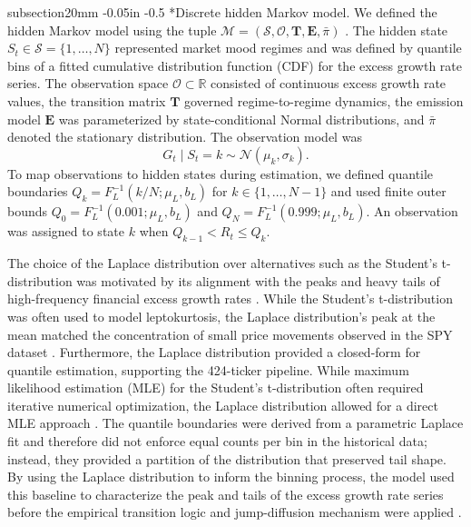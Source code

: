 \documentclass[12pt, letterpaper]{article}
\makeatletter
\renewcommand\subsection{\@startsection
	{subsection}{2}{0mm}
	{-0.05in}
	{-0.5\baselineskip}
	{\normalfont\normalsize\bfseries}}
\makeatother
\begin{document}
\subsection*{Discrete hidden Markov model.}
We defined the hidden Markov model using the tuple $\mathcal{M} = (\mathcal{S}, \mathcal{O}, \mathbf{T}, \mathbf{E}, \bar{\pi})$ \cite{rabiner_introduction_1986}. The hidden state $S_t \in \mathcal{S} = \{1,\dots,N\}$ represented market mood regimes and was defined by quantile bins of a fitted cumulative distribution function (CDF) for the excess growth rate series. The observation space $\mathcal{O} \subset \mathbb{R}$ consisted of continuous excess growth rate values, the transition matrix $\mathbf{T}$ governed regime-to-regime dynamics, the emission model $\mathbf{E}$ was parameterized by state-conditional Normal distributions, and $\bar{\pi}$ denoted the stationary distribution. The observation model was
\begin{equation}
    G_t \mid S_t = k \sim \mathcal{N}(\mu_k, \sigma_k).
\end{equation}
To map observations to hidden states during estimation, we defined quantile boundaries $Q_k = F_L^{-1}(k/N; \mu_L, b_L)$ for $k \in \{1,\dots,N-1\}$ and used finite outer bounds $Q_0 = F_L^{-1}(0.001; \mu_L, b_L)$ and $Q_N = F_L^{-1}(0.999; \mu_L, b_L)$. An observation was assigned to state $k$ when $Q_{k-1} < R_t \le Q_k$.

The choice of the Laplace distribution over alternatives such as the Student's t-distribution was motivated by its alignment with the peaks and heavy tails of high-frequency financial excess growth rates \cite{cont_empirical_2001, kotz_laplace_2001}. While the Student's t-distribution was often used to model leptokurtosis, the Laplace distribution's peak at the mean matched the concentration of small price movements observed in the SPY dataset \cite{mandelbrot_variation_1963, harwood_against_2019}. Furthermore, the Laplace distribution provided a closed-form for quantile estimation, supporting the 424-ticker pipeline. While maximum likelihood estimation (MLE) for the Student's t-distribution often required iterative numerical optimization, the Laplace distribution allowed for a direct MLE approach \cite{bilmes_gentle_nodate}. The quantile boundaries were derived from a parametric Laplace fit and therefore did not enforce equal counts per bin in the historical data; instead, they provided a partition of the distribution that preserved tail shape. By using the Laplace distribution to inform the binning process, the model used this baseline to characterize the peak and tails of the excess growth rate series before the empirical transition logic and jump-diffusion mechanism were applied \cite{kou_jump-diffusion_2002}.
\end{document}
